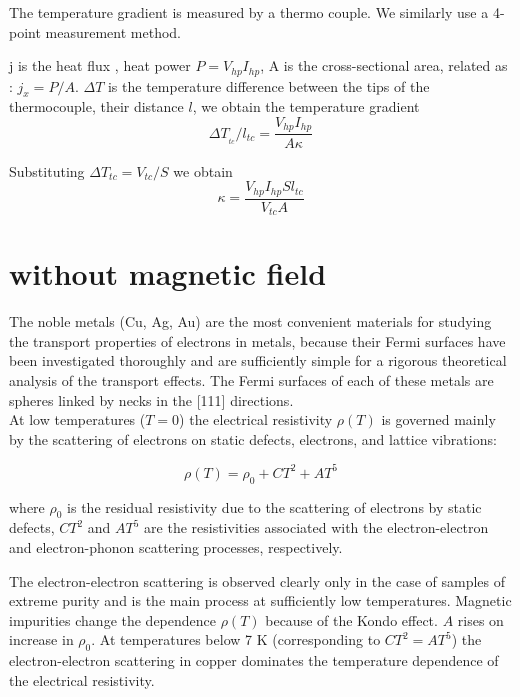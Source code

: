 \documentclass[openany,11pt,a4paper]{report}
\begin{document}
The temperature gradient is measured by
a thermo couple. We similarly use a 4-point measurement method.\

j is the heat flux , heat power $P=V_{hp}I_{hp}$, A is the cross-sectional area, related as : $j_{x}= P/A $. $\Delta T$ is the temperature difference between the tips of the thermocouple, their distance $l$, we obtain the temperature gradient 
\begin{equation}
\Delta T_{_{tc}} /l_{tc} = \dfrac{V_{hp}I_{hp}}{A \kappa}
\end{equation}

Substituting $\Delta T_{tc}= V_{tc} / S$ we obtain 
\begin{equation}
\kappa = \dfrac{V_{hp} I_{hp} S l_{tc}}{V_{tc} A}
\end{equation}

\section{without magnetic field \cite{1}}
The noble metals (Cu, Ag, Au) are the most convenient materials for studying the transport properties of electrons in metals, because their Fermi surfaces have been investigated thoroughly and are sufficiently
simple for a rigorous theoretical analysis of the transport effects. The Fermi surfaces of each of these metals
are spheres linked by necks in the [111] directions.\\



At low temperatures ($T=0$) the electrical resistivity $\rho (T)$ is governed mainly by the scattering of electrons on static defects,
electrons, and lattice vibrations:

\begin{equation}
\rho (T)=  \rho_{0} + CT^{2} + AT^{5} 
\label{eq:1}
\end{equation} 

where $\rho_{0}$ is the residual resistivity due to the scattering of
electrons by static defects, $ CT^{2}$ and $AT^{5}$ are the resistivities
associated with the electron-electron and electron-phonon scattering processes, respectively.\

The electron-electron scattering is observed clearly only in the case of samples of extreme purity and is the
main process at sufficiently low temperatures. Magnetic impurities change the dependence $\rho (T)$ because of the Kondo effect. $A$ rises on increase
in $\rho _{0}$. At temperatures below 7 K (corresponding to $CT^{2} = AT^{5}$) the electron-electron
scattering in copper dominates the temperature dependence of the electrical resistivity.\\
\end{document}
